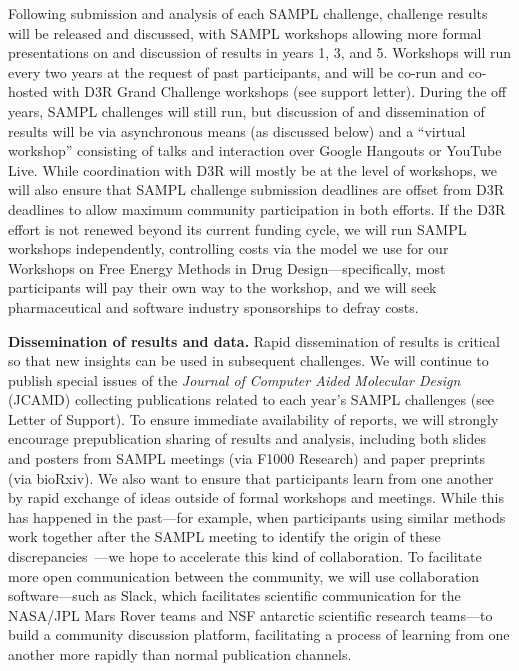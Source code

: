 \documentclass[11pt]{article}
\begin{document}
Following submission and analysis of each SAMPL challenge, challenge results will be released and discussed, with SAMPL workshops allowing more formal presentations on and discussion of results in years 1, 3, and 5. 
Workshops will run every two years at the request of past participants, and will be co-run and co-hosted with D3R Grand Challenge workshops (see support letter).
During the off years, SAMPL challenges will still run, but discussion of and dissemination of results will be via asynchronous means (as discussed below) and a ``virtual workshop'' consisting of talks and interaction over Google Hangouts or YouTube Live.
While coordination with D3R will mostly be at the level of workshops, we will also ensure that SAMPL challenge submission deadlines are offset from D3R deadlines to allow maximum community participation in both efforts.
If the D3R effort is not renewed beyond its current funding cycle, we will run SAMPL workshops independently, controlling costs via the model we use for our Workshops on Free Energy Methods in Drug Design---specifically, most participants will pay their own way to the workshop, and we will seek pharmaceutical and software industry sponsorships to defray costs. 

{\bf Dissemination of results and data.}
Rapid dissemination of results is critical so that new insights can be used in subsequent challenges.
We will continue to publish special issues of the \emph{Journal of Computer Aided Molecular Design} (JCAMD) collecting publications related to each year's SAMPL challenges (see Letter of Support).
To ensure immediate availability of reports, we will strongly encourage prepublication sharing of results and analysis, including both slides and posters from SAMPL meetings (via F1000 Research) and paper preprints (via bioRxiv).
We also want to ensure that participants learn from one another by rapid exchange of ideas outside of formal workshops and meetings.
While this has happened in the past---for example, when participants using similar methods work together after the SAMPL meeting to identify the origin of these discrepancies~\cite{monroe_converging_2014, yin_overview_2016, bhakat_resolving_2016, bosisio_blinded_2016, mobley_predicting_2016}---we hope to accelerate this kind of collaboration.
To facilitate more open communication between the community, we will use collaboration software---such as Slack, which facilitates scientific communication for the NASA/JPL Mars Rover teams and NSF antarctic scientific research teams---to build a community discussion platform, 
facilitating a process of learning from one another more rapidly than normal publication channels.
\end{document}
